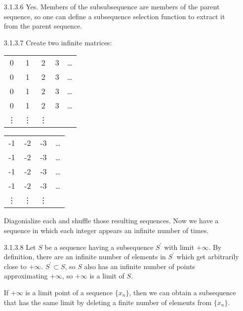 \documentclass{article}
\begin{document}
\begin{enumerate}
  
\item[]
\item[3.1.3.6]
  Yes. 
  Members of the subsubsequence are members of the parent sequence,
  so one can define a subsequence selection function to extract it from
  the parent sequence. 
 \item[]
\item[3.1.3.7]
  Create two infinite matrices:
\item[]
  \begin{tabular}{ c c c c c}
   0 & 1 & 2 & 3 & \ldots \\
   0 & 1 & 2 & 3 & \ldots \\
   0 & 1 & 2 & 3 & \ldots \\
   0 & 1 & 2 & 3 & \ldots \\
   \vdots & \vdots & \vdots & \\
  \end{tabular}
  \begin{tabular}{ c c c c}
  -1 & -2 & -3 & \ldots \\
  -1 & -2 & -3 & \ldots \\
  -1 & -2 & -3 & \ldots \\
  -1 & -2 & -3 & \ldots \\
   \vdots & \vdots & \vdots & \\
  \end{tabular}

  Diagonialize each and shuffle those resulting sequences. 
  Now we have a sequence in which each integer appears an infinite
  number of times. 
\item[]
\item[3.1.3.8]
  Let $S$ be a sequence having a subsequence $S^\prime$ with limit $+\infty$. 
  By definition, there are an infinite number of elements in $S^\prime$
  which get arbitrarily close to $+\infty$. $S^\prime \subset S$, so $S$
  also has an infinite number of points approximating $+\infty$, so 
  $+\infty$ is a limit of $S$.

  If $+\infty$ is a limit point of a sequence $\{ x_n \}$, then 
  we can obtain a subsequence that has the same limit by deleting
  a finite number of elements from $\{ x_n \}$. 
  

\end{enumerate}
\end{document}

